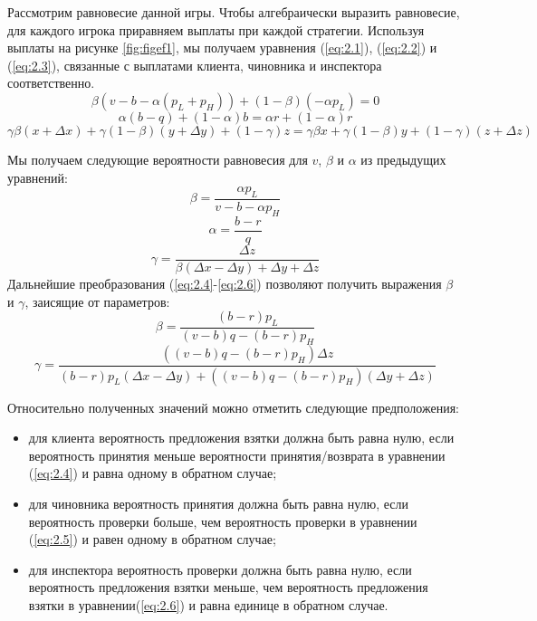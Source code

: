 \par
Рассмотрим равновесие данной игры. Чтобы алгебраически выразить равновесие, для каждого игрока приравняем выплаты при каждой стратегии. Используя выплаты на рисунке \ref{fig:figef1}, мы получаем уравнения (\ref{eq:2.1}), (\ref{eq:2.2}) и (\ref{eq:2.3}), связанные с выплатами клиента, чиновника и инспектора соответственно.
\begin{equation}\label{eq:2.1}
	\beta(v-b-\alpha(p_L + p_H)) + (1 - \beta)(-\alpha p_L)=0
\end{equation}
\begin{equation}\label{eq:2.2}
	\alpha(b-q) + (1-\alpha)b=\alpha r + (1-\alpha)r
\end{equation}
\begin{equation}\label{eq:2.3}
	\gamma \beta(x+\Delta x) + \gamma(1-\beta)(y+\Delta y) + (1 - \gamma)z = \gamma \beta x + \gamma(1-\beta)y + (1 - \gamma) (z + \Delta z)
\end{equation}
\par
Мы получаем следующие вероятности равновесия для $v$, $\beta$ и $\alpha$ из предыдущих уравнений:
\begin{equation}\label{eq:2.4}
	\beta = \frac{\alpha p_L}{v - b - \alpha p_H}
\end{equation}
\begin{equation}\label{eq:2.5}
	\alpha = \frac{b - r}{q}
\end{equation}
\begin{equation}\label{eq:2.6}
	\gamma = \frac{\Delta z}{\beta (\Delta x - \Delta y) + \Delta y + \Delta z}
\end{equation}
Дальнейшие преобразования (\ref{eq:2.4}-\ref{eq:2.6}) позволяют получить выражения $\beta$ и $\gamma$, заисящие от параметров:
\begin{equation}\label{eq:2.7}
	\beta = \frac{(b - r)p_L}{(v - b)q - (b - r)p_H}
\end{equation}
\begin{equation}\label{eq:2.8}
	\gamma = \frac{((v-b)q - (b - r)p_H)\Delta z}{(b-r)p_L(\Delta x - \Delta y) + ((v-b)q-(b-r)p_H)(\Delta y + \Delta z)}
\end{equation}
\par
Относительно полученных значений можно отметить следующие предположения:
\begin{itemize}
	\item для клиента вероятность предложения взятки должна быть равна нулю, если вероятность принятия меньше вероятности принятия/возврата в уравнении (\ref{eq:2.4}) и равна одному в обратном случае;
	\item для чиновника вероятность принятия должна быть равна нулю, если вероятность проверки больше, чем вероятность проверки в уравнении (\ref{eq:2.5}) и равен одному в обратном случае;
	\item для инспектора вероятность проверки должна быть равна нулю, если вероятность предложения взятки меньше, чем вероятность предложения взятки в уравнении(\ref{eq:2.6}) и равна единице в обратном случае.
\end{itemize}
